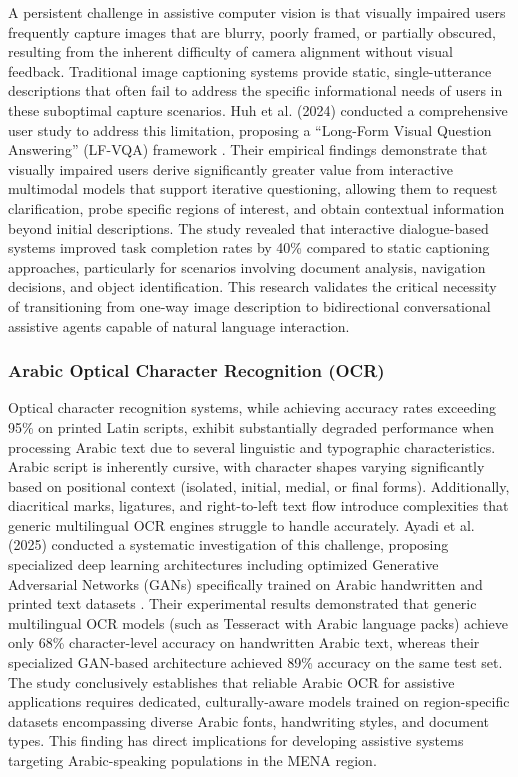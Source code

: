 \documentclass[a4paper]{report}
\begin{document}
A persistent challenge in assistive computer vision is that visually impaired users frequently capture images that are blurry, poorly framed, or partially obscured, resulting from the inherent difficulty of camera alignment without visual feedback. Traditional image captioning systems provide static, single-utterance descriptions that often fail to address the specific informational needs of users in these suboptimal capture scenarios. Huh et al. (2024) conducted a comprehensive user study to address this limitation, proposing a ``Long-Form Visual Question Answering'' (LF-VQA) framework \cite{huh2024longform}. Their empirical findings demonstrate that visually impaired users derive significantly greater value from interactive multimodal models that support iterative questioning, allowing them to request clarification, probe specific regions of interest, and obtain contextual information beyond initial descriptions. The study revealed that interactive dialogue-based systems improved task completion rates by 40\% compared to static captioning approaches, particularly for scenarios involving document analysis, navigation decisions, and object identification. This research validates the critical necessity of transitioning from one-way image description to bidirectional conversational assistive agents capable of natural language interaction.

\subsubsection{Arabic Optical Character Recognition (OCR)}

Optical character recognition systems, while achieving accuracy rates exceeding 95\% on printed Latin scripts, exhibit substantially degraded performance when processing Arabic text due to several linguistic and typographic characteristics. Arabic script is inherently cursive, with character shapes varying significantly based on positional context (isolated, initial, medial, or final forms). Additionally, diacritical marks, ligatures, and right-to-left text flow introduce complexities that generic multilingual OCR engines struggle to handle accurately. Ayadi et al. (2025) conducted a systematic investigation of this challenge, proposing specialized deep learning architectures including optimized Generative Adversarial Networks (GANs) specifically trained on Arabic handwritten and printed text datasets \cite{ayadi2025arabic}. Their experimental results demonstrated that generic multilingual OCR models (such as Tesseract with Arabic language packs) achieve only 68\% character-level accuracy on handwritten Arabic text, whereas their specialized GAN-based architecture achieved 89\% accuracy on the same test set. The study conclusively establishes that reliable Arabic OCR for assistive applications requires dedicated, culturally-aware models trained on region-specific datasets encompassing diverse Arabic fonts, handwriting styles, and document types. This finding has direct implications for developing assistive systems targeting Arabic-speaking populations in the MENA region.
\end{document}
